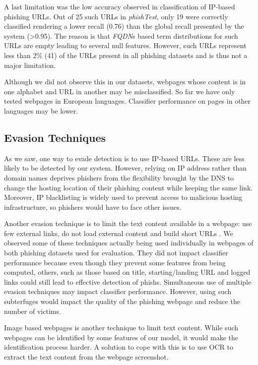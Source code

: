 \documentclass[10pt,conference,compsocconf,letterpaper]{IEEEtran}
\begin{document}
A last limitation was the low accuracy observed in classification of IP-based phishing URLs. Out of 25 such URLs in \textit{phishTest}, only 19 were correctly classified rendering a lower recall (0.76) than the global recall presented by the system (\textgreater 0.95). The reason is that \textit{FQDN}s based term distributions for such URLs are empty leading to several null features. However, such URLs represent less than 2\% (41) of the URLs present in all phishing datasets and is thus not a major limitation.

Although we did not observe this in our datasets, webpages whose content is in one alphabet and URL in another may be misclassified. So far we have only tested webpages in European languages. Classifier performance on pages in other languages may be lower.





\subsection{Evasion Techniques}

As we saw, one way to evade detection is to use IP-based URLs. These are less likely to be detected by our system. However, relying on IP address rather than domain names deprives phishers from the flexibility brought by the DNS to change the hosting location of their phishing content while keeping the same link. Moreover, IP blacklisting is widely used to prevent access to malicious hosting infrastructure, so phishers would have to face other issues.

Another evasion technique is to limit the text content available in a webpage: use few external links, do not load external content and build short 
URLs \cite{maggi:2013:two}.
We observed some of these techniques actually being used individually in webpages of both phishing datasets used for evaluation. They did not impact classifier performance because even though they prevent some features from being computed, others, such as those based on title, starting/landing URL and logged links could still lead to effective detection of phishs. Simultaneous use of multiple evasion techniques may impact classifier performance.
However, using such subterfuges would impact the quality of the phishing webpage and reduce the number of victims. 

\iffullversion
Image based webpages is another technique to limit text content. While such webpages can be identified by some features of our model, it would make the identification process harder. A solution to cope with this is to use OCR to extract the text content from the webpage screenshot.
\fi
\end{document}
